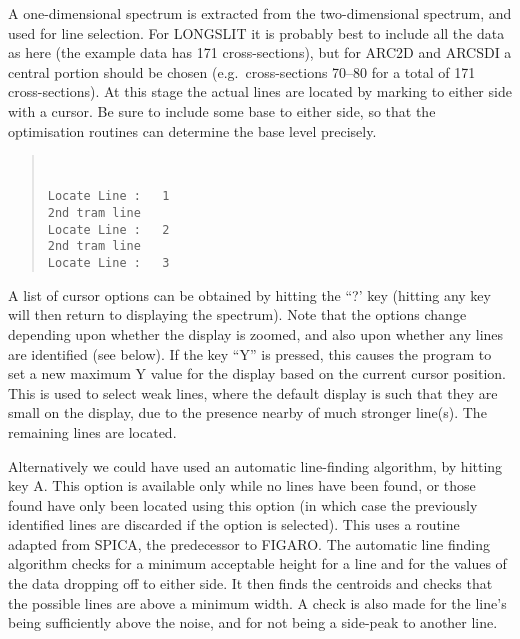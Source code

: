 A one-dimensional spectrum is extracted from the two-dimensional
spectrum, and used for line selection.
For LONGSLIT it is probably best to include all the data as here (the
example data has 171 cross-sections), but for ARC2D and ARCSDI a central
portion should be chosen (e.g.\ cross-sections 70--80 for a total of 171
cross-sections).
At this stage the actual lines are located by marking to either side
with a cursor.
Be sure to include some base to either side, so that the optimisation
routines can determine the base level precisely.
\begin{quote}\begin{verbatim}


Locate Line :   1
2nd tram line
Locate Line :   2
2nd tram line
Locate Line :   3
\end{verbatim}\end{quote}
A list of cursor options can be obtained by hitting the ``?' key (hitting
any key will then return to displaying the spectrum).
Note that the options change depending upon whether the display is
zoomed, and also upon whether any lines are identified (see below).
If the key ``Y'' is pressed, this causes the program to set a new
maximum Y value for the display based on the current cursor position.
This is used to select weak lines, where the default display is such
that they are small on the display, due to the presence nearby of much
stronger line(s).
The remaining lines are located.

Alternatively we could have used an automatic line-finding algorithm, by
hitting key A. This option is available only while no lines have been found,
or those found have only been located using this option (in which case the
previously identified lines are discarded if the option is selected).
This uses a routine adapted from SPICA, the predecessor to FIGARO.
The automatic line finding algorithm checks for a
minimum acceptable height for a line and for the values of the data
dropping off to either side. It then finds the centroids and checks
that the possible lines are above a minimum width. A check is also made
for the line's being sufficiently above the noise, and for not being a
side-peak to another line.


